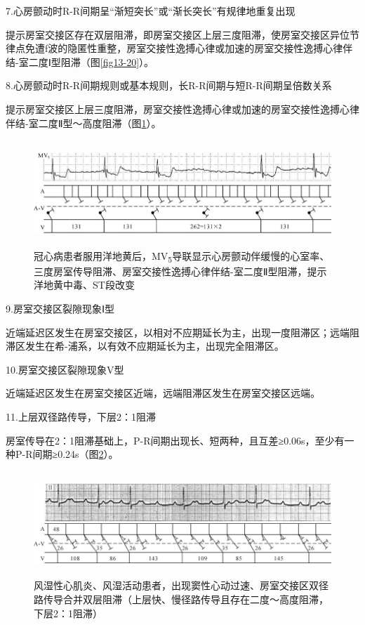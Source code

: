 7.心房颤动时R-R间期呈“渐短突长”或“渐长突长”有规律地重复出现

提示房室交接区存在双层阻滞，即房室交接区上层三度阻滞，使房室交接区异位节律点免遭f波的隐匿性重整，房室交接性逸搏心律或加速的房室交接性逸搏心律伴结-室二度Ⅰ型阻滞（图\ref{fig13-20}）。

8.心房颤动时R-R间期规则或基本规则，长R-R间期与短R-R间期呈倍数关系

提示房室交接区上层三度阻滞，房室交接性逸搏心律或加速的房室交接性逸搏心律伴结-室二度Ⅱ型～高度阻滞（图\ref{fig24-7}）。

\begin{figure}[!htbp]
 \centering
 \includegraphics[width=5.79167in,height=1.57292in]{./images/Image00402.jpg}
 \captionsetup{justification=centering}
 \caption{冠心病患者服用洋地黄后，MV\textsubscript{5}导联显示心房颤动伴缓慢的心室率、三度房室传导阻滞、房室交接性逸搏心律伴结-室二度Ⅱ型阻滞，提示洋地黄中毒、ST段改变}
 \label{fig24-7}
  \end{figure} 


9.房室交接区裂隙现象Ⅰ型

近端延迟区发生在房室交接区，以相对不应期延长为主，出现一度阻滞区；远端阻滞区发生在希-浦系，以有效不应期延长为主，出现完全阻滞区。

10.房室交接区裂隙现象V型

近端延迟区发生在房室交接区近端，远端阻滞区发生在房室交接区远端。

11.上层双径路传导，下层2：1阻滞

房室传导在2：1阻滞基础上，P-R间期出现长、短两种，且互差≥0.06s，至少有一种P-R间期≥0.24s（图\ref{fig24-8}）。

\begin{figure}[!htbp]
 \centering
 \includegraphics[width=5.82292in,height=1.55208in]{./images/Image00403.jpg}
 \captionsetup{justification=centering}
 \caption{风湿性心肌炎、风湿活动患者，出现窦性心动过速、房室交接区双径路传导合并双层阻滞（上层快、慢径路传导且存在二度～高度阻滞，下层2：1阻滞）}
 \label{fig24-8}
  \end{figure} 

